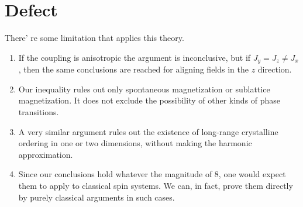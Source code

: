 \section{Defect}
There' re some limitation that applies this theory.
\begin{enumerate}
    \item If the coupling is anisotropic the argument is inconclusive, but if $J_y = J_z \neq J_x$, then the same conclusions are reached for aligning fields in the $z$ direction.
    \item Our inequality rules out only spontaneous magnetization or sublattice magnetization. It does not exclude the possibility of other kinds of phase transitions.
    \item A very similar argument rules out the existence of long-range crystalline ordering in one or two dimensions, without making the harmonic approximation.
    \item Since our conclusions hold whatever the magnitude of 8, one would expect them to apply to classical spin systems. We can, in fact, prove them directly by purely classical arguments in such cases.
\end{enumerate}
